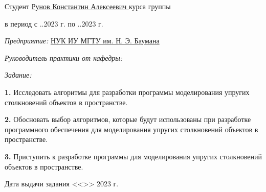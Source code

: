 \fontsize{14pt}{14pt}\selectfont

\noindent Студент \uline{\hfill Рунов Константин Алексеевич \hfill}  курса группы 

\vspace{0.3cm}

\noindent в период с ..2023 г. по ..2023 г.

\vspace{0.3cm}

\noindent \textit{Предприятие:} \uline{\hfill НУК ИУ МГТУ им. Н. Э. Баумана \hfill}

\vspace{0.3cm}






\noindent \textit{Руководитель практики от кафедры:}

\noindent {}

\vspace{0.3cm}

\noindent \textit{Задание:}

\noindent \textbf{1.} Исследовать алгоритмы для разработки программы моделирования упругих столкновений объектов в пространстве.

\noindent \textbf{2.} Обосновать выбор алгоритмов,
которые будут использованы при разработке программного обеспечения для моделирования упругих столкновений объектов в пространстве.

\noindent \textbf{3.} Приступить к разработке программы для моделирования упругих столкновений объектов в пространстве.

\vfill

\noindent Дата выдачи задания <<>> 2023 г.

\vspace{1cm}


